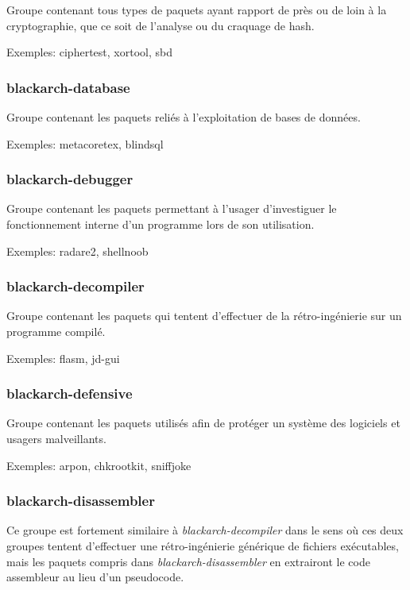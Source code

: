 \documentclass[a4paper, oneside, 11pt]{book}
\begin{document}
Groupe contenant tous types de paquets ayant rapport de près ou de loin à la
cryptographie, que ce soit de l'analyse ou du craquage de hash.

Exemples: ciphertest, xortool, sbd

\subsubsection{blackarch-database}

Groupe contenant les paquets reliés à l'exploitation de bases de données.

Exemples: metacoretex, blindsql

\subsubsection{blackarch-debugger}

Groupe contenant les paquets permettant à l'usager d’investiguer le
fonctionnement interne d'un programme lors de son utilisation.

Exemples: radare2, shellnoob

\subsubsection{blackarch-decompiler}

Groupe contenant les paquets qui tentent d'effectuer de la rétro-ingénierie sur
un programme compilé.

Exemples: flasm, jd-gui

\subsubsection{blackarch-defensive}

Groupe contenant les paquets utilisés afin de protéger un système des logiciels
et usagers malveillants.

Exemples: arpon, chkrootkit, sniffjoke

\subsubsection{blackarch-disassembler}

Ce groupe est fortement similaire à \textit{blackarch-decompiler} dans le sens
où ces deux groupes tentent d'effectuer une rétro-ingénierie générique de
fichiers exécutables, mais les paquets compris dans
\textit{blackarch-disassembler} en extrairont le code assembleur au lieu d'un
pseudocode.
\end{document}
